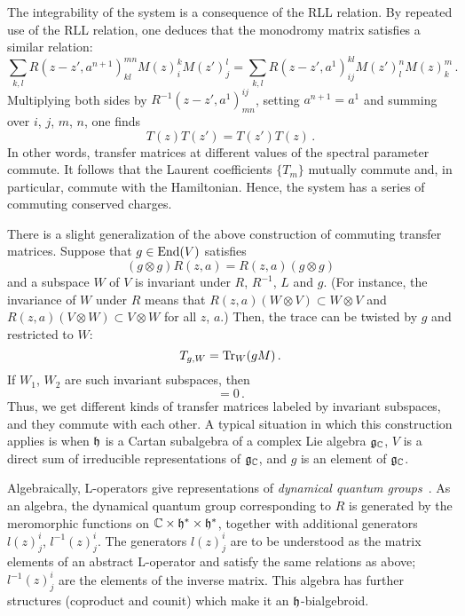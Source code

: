 The integrability of the system is a consequence of the RLL relation.
By repeated use of the RLL relation, one deduces that the monodromy
matrix satisfies a similar relation:
\begin{equation}
  \sum_{k,l}
  R(z-z', a^{n+1})^{mn}_{kl}
  M(z)^k_i M(z')^l_j
  =
  \sum_{k,l}
  R(z-z', a^1)^{kl}_{ij}
  M(z')^n_l M(z)^m_k
  \,.
\end{equation}
Multiplying both sides by $R^{-1}(z-z', a^1)^{ij}_{mn}$, setting
$a^{n+1} = a^1$ and summing over $i$, $j$, $m$, $n$, one
finds
\begin{equation}
  T(z) T(z') = T(z') T(z) \,.
\end{equation}
In other words, transfer matrices at different values of the spectral
parameter commute.  It follows that the Laurent coefficients $\{T_m\}$
mutually commute and, in particular, commute with the Hamiltonian.
Hence, the system has a series of commuting conserved charges.

There is a slight generalization of the above construction of
commuting transfer matrices.  Suppose that $g \in \mathop{\mathrm{End}}\nolimits(V)$ satisfies
\begin{equation}
  (g \otimes g) R(z,a)
  =  R(z,a) (g \otimes g)
\end{equation}
and a subspace $W$ of $V$ is invariant under $R$, $R^{-1}$, $L$ and
$g$.  (For instance, the invariance of $W$ under $R$ means that
$R(z,a)(W \otimes V) \subset W \otimes V$ and
$R(z,a)(V \otimes W) \subset V \otimes W$ for all $z$, $a$.)  Then,
the trace can be twisted by $g$ and restricted to $W$:
\begin{equation}
  T_{g,W} = \mathop{\mathrm{Tr}}\nolimits_W(gM) \,.
\end{equation}
If $W_1$, $W_2$ are such invariant subspaces, then
\begin{equation}
  [T_{g,W_1}(z), T_{g,W_2}(z')] = 0 \,.
\end{equation}
Thus, we get different kinds of transfer matrices labeled by invariant
subspaces, and they commute with each other.  A typical situation in
which this construction applies is when $\mathfrak{h}$ is a Cartan subalgebra
of a complex Lie algebra $\mathfrak{g}_{\mathbb{C}}$, $V$ is a direct sum of irreducible
representations of $\mathfrak{g}_{\mathbb{C}}$, and $g$ is an element of $\mathfrak{g}_{\mathbb{C}}$.

Algebraically, L-operators give representations of \emph{dynamical
  quantum groups}~\cite{Felder:1994be, Felder:1994pb, MR1645196}.  As
an algebra, the dynamical quantum group corresponding to $R$ is
generated by the meromorphic functions on
$\mathbb{C} \times \mathfrak{h}^* \times \mathfrak{h}^*$, together with additional generators
$l(z)^i_j$, $l^{-1}(z)^i_j$.  The generators $l(z)^i_j$ are to be
understood as the matrix elements of an abstract L-operator and
satisfy the same relations as above; $l^{-1}(z)^i_j$ are the elements
of the inverse matrix.  This algebra has further structures (coproduct
and counit) which make it an $\mathfrak{h}$-bialgebroid.





